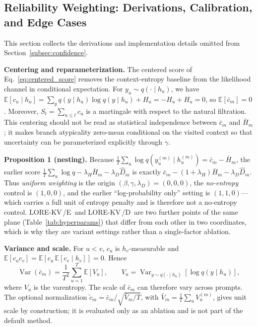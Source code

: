 \documentclass{article} %
\newcommand{\lorekvE}{LORE-KV\,/E}
\newcommand{\lorekvD}{LORE-KV\,/D}
\begin{document}
\subsection{Reliability Weighting: Derivations, Calibration, and Edge Cases}
\label{app:reliability_details}

This section collects the derivations and implementation details omitted from Section~\ref{subsec:confidence}.

\textbf{Centering and reparameterization.}
The centered score of Eq.~\ref{eq:centered_score} removes the context-entropy baseline from the likelihood channel in conditional expectation. For $y_u\sim q(\cdot\mid h_u)$, we have $\mathbb{E}[c_u\mid h_u]=\sum_y q(y\mid h_u)\log q(y\mid h_u)+H_u=-H_u+H_u=0$, so $\mathbb{E}[\bar c_m]=0$. Moreover, $S_t=\sum_{u\le t}c_u$ is a martingale with respect to the natural filtration. This centering should not be read as statistical independence between $\bar c_m$ and $\bar H_m$; it makes branch atypicality zero-mean conditional on the visited context so that uncertainty can be parameterized explicitly through $\gamma$.

\textbf{Proposition 1 (nesting).}
Because $\tfrac1T\sum_u\log q(y^{(m)}_u\mid h^{(m)}_u)=\bar c_m-\bar H_m$, the earlier score
$\tfrac1T\sum_u\log q-\lambda_H\bar H_m-\lambda_D\hat D_m$
is exactly
$\bar c_m-(1+\lambda_H)\bar H_m-\lambda_D\hat D_m$.
Thus \emph{uniform weighting} is the origin $(\beta,\gamma,\lambda_D)=(0,0,0)$, the \emph{no-entropy} control is $(1,0,0)$, and the earlier ``log-probability only'' setting is $(1,1,0)$---which carries a full unit of entropy penalty and is therefore not a no-entropy control. \lorekvE\ and \lorekvD\ are two further points of the same plane (Table~\ref{tab:hyperparams}) that differ from each other in two coordinates, which is why they are variant settings rather than a single-factor ablation.

\textbf{Variance and scale.}
For $u<v$, $c_u$ is $h_v$-measurable and $\mathbb{E}[c_uc_v]=\mathbb{E}[c_u\,\mathbb{E}[c_v\mid h_v]]=0$. Hence
\begin{equation}
\operatorname{Var}(\bar c_m)
=\frac{1}{T^2}\sum_{u=1}^{T}\mathbb{E}[V_u],
\qquad
V_u=\operatorname{Var}_{y\sim q(\cdot\mid h_u)}[\log q(y\mid h_u)],
\label{eq:varentropy}
\end{equation}
where $V_u$ is the varentropy. The scale of $\bar c_m$ can therefore vary across prompts. The optional normalization
$\tilde c_m=\bar c_m/\sqrt{\bar V_m/T}$, with $\bar V_m=\tfrac1T\sum_uV^{(m)}_u$, gives unit scale by construction; it is evaluated only as an ablation and is not part of the default method.
\end{document}

